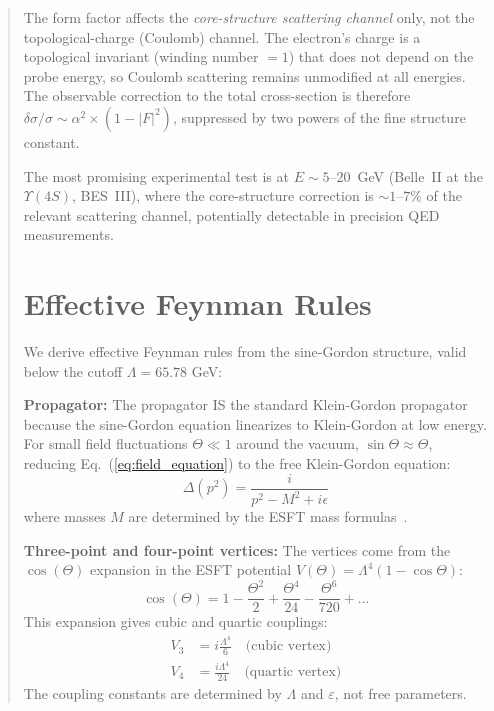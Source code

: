 ﻿\documentclass[twocolumn,prd,amsmath,amssymb,aps]{revtex4-2}
\begin{document}
\begin{abstract}
The form factor affects the \emph{core-structure scattering channel} only, not the topological-charge (Coulomb) channel. The electron's charge is a topological invariant (winding number $= 1$) that does not depend on the probe energy, so Coulomb scattering remains unmodified at all energies. The observable correction to the total cross-section is therefore $\delta\sigma/\sigma \sim \alpha^2 \times (1 - |F|^2)$, suppressed by two powers of the fine structure constant.

The most promising experimental test is at $E \sim 5$--$20$~GeV (Belle~II at the $\Upsilon(4S)$, BES~III), where the core-structure correction is $\sim 1$--$7\%$ of the relevant scattering channel, potentially detectable in precision QED measurements.

\section{Effective Feynman Rules}

We derive effective Feynman rules from the sine-Gordon structure, valid below the cutoff $\Lambda = 65.78$ GeV:

\textbf{Propagator:} The propagator IS the standard Klein-Gordon propagator because the sine-Gordon equation linearizes to Klein-Gordon at low energy. For small field fluctuations $\Theta \ll 1$ around the vacuum, $\sin\Theta \approx \Theta$, reducing Eq.~(\ref{eq:field_equation}) to the free Klein-Gordon equation:
\begin{equation}
\Delta(p^2) = \frac{i}{p^2 - M^2 + i\epsilon}
\end{equation}
where masses $M$ are determined by the ESFT mass formulas~\cite{ESFT1,ESFT2,ESFT3}.

\textbf{Three-point and four-point vertices:} The vertices come from the $\cos(\Theta)$ expansion in the ESFT potential $V(\Theta) = \Lambda^4(1-\cos\Theta)$:
\begin{equation}
\cos(\Theta) = 1 - \frac{\Theta^2}{2} + \frac{\Theta^4}{24} - \frac{\Theta^6}{720} + \ldots
\end{equation}
This expansion gives cubic and quartic couplings:
\begin{align}
V_3 &= i\frac{\Lambda^4}{6} \quad \text{(cubic vertex)} \\
V_4 &= \frac{i\Lambda^4}{24} \quad \text{(quartic vertex)}
\end{align}
The coupling constants are determined by $\Lambda$ and $\varepsilon$, not free parameters.


\end{abstract}
\end{document}

